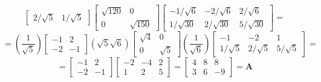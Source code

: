 \begin{enumerate}[label=(\alph*)]
\[\begin{bmatrix}
                    2/\sqrt{5} & 1/\sqrt{5}
                \end{bmatrix}
                \begin{bmatrix}
                    \sqrt{120} & 0 \\
                    0 & \sqrt{150}
                \end{bmatrix}
                \begin{bmatrix}
                    -1/\sqrt{6} & -2/\sqrt{6} & 2/\sqrt{6} \\
                    1/\sqrt{30} & 2/\sqrt{30} & 5/\sqrt{30}
                \end{bmatrix}
                =
            \]
            \[
                =
                \left(\frac{1}{\sqrt{5}}\right)
                \begin{bmatrix}
                    -1 & 2 \\
                    -2 & -1
                \end{bmatrix}
                \left(\sqrt{5}\sqrt{6}\right)
                \begin{bmatrix}
                    \sqrt{4} & 0 \\
                    0 & \sqrt{5}
                \end{bmatrix}
                \left(\frac{1}{\sqrt{6}}\right)
                \begin{bmatrix}
                    -1 & -2 & 1 \\
                    1/\sqrt{5} & 2/\sqrt{5} & 5/\sqrt{5}
                \end{bmatrix}
                =
            \]
            \[
                =
                \begin{bmatrix}
                    -1 & 2 \\
                    -2 & -1
                \end{bmatrix}
                \begin{bmatrix}
                    -2 & -4 & 2 \\
                    1 & 2 & 5
                \end{bmatrix}
                =
                \begin{bmatrix}
                    4 & 8 & 8 \\
                    3 & 6 & -9
                \end{bmatrix}
                =
                \mathbf{A}
            \]
        \end{enumerate}